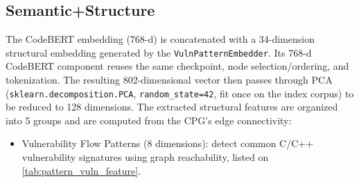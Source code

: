 \subsection{Semantic+Structure}
The CodeBERT embedding (768-d) is concatenated with a 34-dimension structural embedding generated by the \texttt{VulnPatternEmbedder}. Its 768-d CodeBERT component reuses the same checkpoint, node selection/ordering, and tokenization. The resulting 802-dimensional vector then passes through PCA (\texttt{sklearn.decomposition.PCA}, \texttt{random\_state=42}, fit once on the index corpus) to be reduced to 128 dimensions. 
The extracted structural features are organized into 5 groups and are computed from the CPG's edge connectivity:
\begin{itemize}
    \item Vulnerability Flow Patterns (8 dimensions): detect common C/C++ vulnerability signatures using graph reachability, listed on \ref{tab:pattern_vuln_feature}.
    

\end{itemize}
